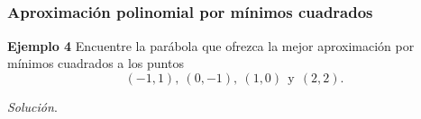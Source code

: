 \subsection{}

\begin{frame}\frametitle{Aproximación polinomial por mínimos cuadrados}
	
	\begin{ej}{\textbf{Ejemplo 4}}\justifying
		Encuentre la parábola que ofrezca la mejor aproximación por mínimos cuadrados a los
		puntos
		\[	
			(-1, 1),\ (0, -1),\ (1, 0) \ \ \text{y} \ \ (2, 2).
		\]
	\end{ej}
	\textit{Solución}.
	
\end{frame}


\subsection{}

